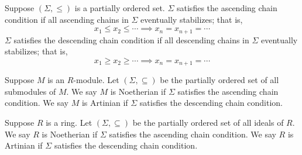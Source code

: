 \begin{definition}
    Suppose \((\Sigma,\leq)\) is a partially ordered set.
    \(\Sigma\) satisfies the ascending chain condition
    if all ascending chains in \(\Sigma\) eventually stabilizes; that is,
    \begin{equation*}
        x_1 \leq x_2 \leq \cdots \implies x_n = x_{n+1} = \cdots
    \end{equation*}
    \(\Sigma\) satisfies the descending chain condition
    if all descending chains in \(\Sigma\) eventually stabilizes; that is,
    \begin{equation*}
        x_1 \geq x_2 \geq \cdots \implies x_n = x_{n+1} = \cdots
    \end{equation*}
\end{definition}
\begin{definition}
    Suppose \(M\) is an \(R\)-module.
    Let \((\Sigma, \subseteq)\) be the partially ordered set of all submodules of \(M\).
    We say \(M\) is Noetherian if \(\Sigma\) satisfies the ascending chain condition.
    We say \(M\) is Artinian if \(\Sigma\) satisfies the descending chain condition.
\end{definition}
\begin{definition}
    Suppose \(R\) is a ring.
    Let \((\Sigma, \subseteq)\) be the partially ordered set of all ideals of \(R\).
    We say \(R\) is Noetherian if \(\Sigma\) satisfies the ascending chain condition.
    We say \(R\) is Artinian if \(\Sigma\) satisfies the descending chain condition.
\end{definition}


